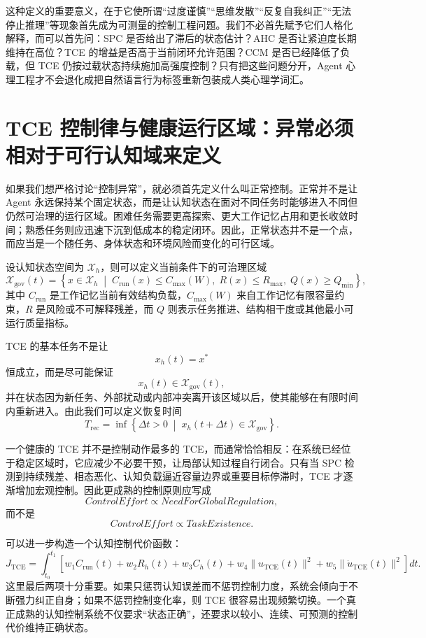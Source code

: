 这种定义的重要意义，在于它使所谓“过度谨慎”“思维发散”“反复自我纠正”“无法停止推理”等现象首先成为可测量的控制工程问题。我们不必首先赋予它们人格化解释，而可以首先问：SPC 是否给出了滞后的状态估计？AHC 是否让紧迫度长期维持在高位？TCE 的增益是否高于当前闭环允许范围？CCM 是否已经降低了负载，但 TCE 仍按过载状态持续施加高强度控制？只有把这些问题分开，Agent 心理工程才不会退化成把自然语言行为标签重新包装成人类心理学词汇。

\section{TCE 控制律与健康运行区域：异常必须相对于可行认知域来定义}

如果我们想严格讨论“控制异常”，就必须首先定义什么叫正常控制。正常并不是让 Agent 永远保持某个固定状态，而是让认知状态在面对不同任务时能够进入不同但仍然可治理的运行区域。困难任务需要更高探索、更大工作记忆占用和更长收敛时间；熟悉任务则应迅速下沉到低成本的稳定闭环。因此，正常状态并不是一个点，而应当是一个随任务、身体状态和环境风险而变化的可行区域。

设认知状态空间为 \(\mathcal X_h\)，则可以定义当前条件下的可治理区域
\[
\mathcal X_{\mathrm{gov}}(t)
=
\left\{
x\in\mathcal X_h
\;\middle|\;
C_{\mathrm{run}}(x)\leq C_{\max}(W),
\;
R(x)\leq R_{\max},
\;
Q(x)\geq Q_{\min}
\right\},
\]
其中 \(C_{\mathrm{run}}\) 是工作记忆当前有效结构负载，\(C_{\max}(W)\) 来自工作记忆有限容量约束，\(R\) 是风险或不可解释残差，而 \(Q\) 则表示任务推进、结构相干度或其他最小可运行质量指标。

TCE 的基本任务不是让
\[
x_h(t)=x^\ast
\]
恒成立，而是尽可能保证
\[
x_h(t)\in\mathcal X_{\mathrm{gov}}(t),
\]
并在状态因为新任务、外部扰动或内部冲突离开该区域以后，使其能够在有限时间内重新进入。由此我们可以定义恢复时间
\[
T_{\mathrm{rec}}
=
\inf
\left\{
\Delta t>0
\;\middle|\;
x_h(t+\Delta t)\in\mathcal X_{\mathrm{gov}}
\right\}.
\]

一个健康的 TCE 并不是控制动作最多的 TCE，而通常恰恰相反：在系统已经位于稳定区域时，它应减少不必要干预，让局部认知过程自行闭合。只有当 SPC 检测到持续残差、相态恶化、认知负载逼近容量边界或重要目标停滞时，TCE 才逐渐增加宏观控制。因此更成熟的控制原则应写成
\[
\boxed{
ControlEffort
\propto
NeedForGlobalRegulation,
}
\]
而不是
\[
ControlEffort
\propto
TaskExistence.
\]

可以进一步构造一个认知控制代价函数：
\[
J_{\mathrm{TCE}}
=
\int_{t_0}^{t_1}
\left[
w_1 C_{\mathrm{run}}(t)
+
w_2 R_h(t)
+
w_3 C_h(t)
+
w_4 \|u_{\mathrm{TCE}}(t)\|^2
+
w_5 \|\dot u_{\mathrm{TCE}}(t)\|^2
\right]dt.
\]
这里最后两项十分重要。如果只惩罚认知误差而不惩罚控制力度，系统会倾向于不断强力纠正自身；如果不惩罚控制变化率，则 TCE 很容易出现频繁切换。一个真正成熟的认知控制系统不仅要求“状态正确”，还要求以较小、连续、可预测的控制代价维持正确状态。

